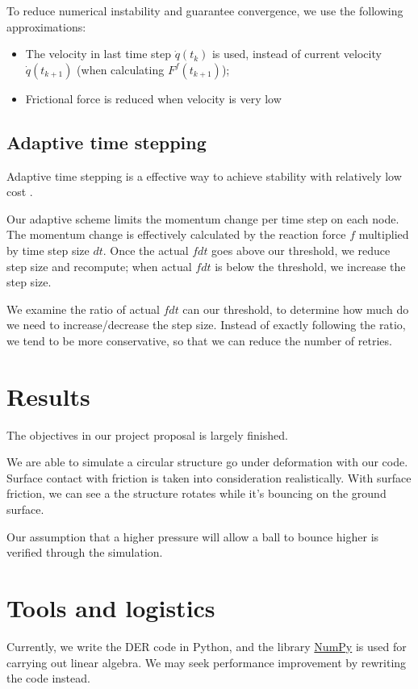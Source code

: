 \documentclass[letterpaper,9pt]{article}
\begin{document}
\begin{multicols}{2}
				To reduce numerical instability and guarantee convergence, we use the following approximations:
				\begin{itemize}
					\item The velocity in last time step $\dot q(t_k)$ is used, instead of current velocity $\dot q(t_{k+1})$ (when calculating $F^f(t_{k+1})$);
					\item Frictional force is reduced when velocity is very low
				\end{itemize}
		\subsection{Adaptive time stepping}
			Adaptive time stepping is a effective way to achieve stability with relatively low cost \cite{Soderlind06}.
			
			Our adaptive scheme limits the momentum change per time step on each node. The momentum change is effectively calculated by the reaction force $f$ multiplied by time step size $dt$. Once the actual $fdt$ goes above our threshold, we reduce step size and recompute; when actual $fdt$ is below the threshold, we increase the step size. 
			
			We examine the ratio of actual $fdt$ can our threshold, to determine how much do we need to increase/decrease the step size. Instead of exactly following the ratio, we tend to be more conservative, so that we can reduce the number of retries.
	\section{Results}
		The objectives in our project proposal is largely finished.
		
		We are able to simulate a circular structure go under deformation with our code. Surface contact with friction is taken into consideration realistically. With surface friction, we can see a the structure rotates while it's bouncing on the ground surface.	
		
		Our assumption that a higher pressure will allow a ball to bounce higher is verified through the simulation.
	\section{Tools and logistics}
		Currently, we write the DER code in Python, and the library \href{http://www.numpy.org}{NumPy} is used for carrying out linear algebra. We may seek performance improvement by rewriting the code instead.
		

\end{multicols}
\end{document}
